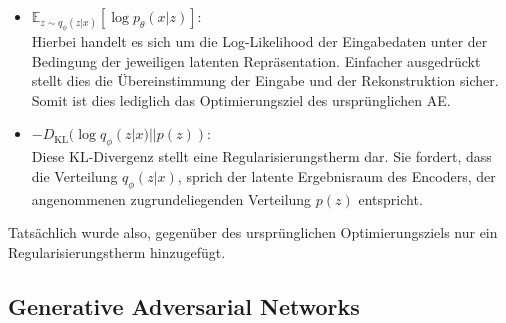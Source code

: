 \begin{itemize}
    \item $\mathbb E_{z \sim q_{\phi}(z|x)}
        \left [
            \log p_\theta(x|z)
        \right ]$: \\
    Hierbei handelt es sich um die Log-Likelihood der Eingabedaten unter der Bedingung der jeweiligen latenten Repräsentation. Einfacher ausgedrückt stellt dies die Übereinstimmung der Eingabe und der Rekonstruktion sicher. Somit ist dies lediglich das Optimierungsziel des ursprünglichen AE.
    \item $-D_\text{KL} (\log q_{\phi}(z|x) || p(z))$: \\
    Diese KL-Divergenz stellt eine Regularisierungstherm dar. Sie fordert, dass die Verteilung $q_{\phi}(z|x)$, sprich der latente Ergebnisraum des Encoders, der angenommenen zugrundeliegenden Verteilung $p(z)$ entspricht.
\end{itemize}
Tatsächlich wurde also, gegenüber des ursprünglichen Optimierungsziels nur ein Regularisierungstherm hinzugefügt.



\subsection{Generative Adversarial Networks}

